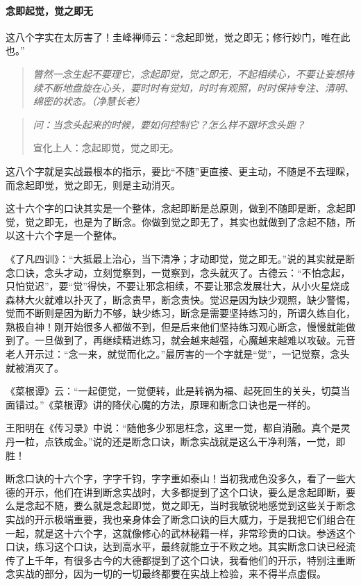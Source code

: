 \paragraph{念即起觉，觉之即无}

这八个字实在太厉害了！圭峰禅师云：“念起即觉，觉之即无；修行妙门，唯在此也。”

\begin{quote}\it
    瞥然一念生起不要理它，念起即觉，觉之即无，不起相续心，不要让妄想持续不断地盘旋在心头，要时时有觉知，时时有观照，时时保持专注、清明、绵密的状态。（净慧长老）
\end{quote}

\begin{quotation}\it
    问：当念头起来的时候，要如何控制它？怎么样不跟坏念头跑？

    宣化上人：念起即觉，觉之即无。
\end{quotation}

这八个字就是实战最根本的指示，要比“不随”更直接、更主动，不随是不去理睬，而念起即觉，觉之即无，则是主动消灭。

这十六个字的口诀其实是一个整体，念起即断是总原则，做到不随即是断，念起即觉，觉之即无，也是为了断念。你做到觉之即无了，其实也就做到了念起不随，所以这十六个字是一个整体。

《了凡四训》：“大抵最上治心，当下清净；才动即觉，觉之即无。”说的其实就是断念口诀，念头才动，立刻觉察到，一觉察到，念头就灭了。古德云：“不怕念起，只怕觉迟”，要“觉”得快，不要让邪念相续，不要让邪念发展壮大，从小火星烧成森林大火就难以扑灭了，断念贵早，断念贵快。觉迟是因为缺少观照，缺少警惕，觉而不断则是因为断力不够，缺少练习，断念是需要坚持练习的，所谓久练自化，熟极自神！刚开始很多人都做不到，但是后来他们坚持练习观心断念，慢慢就能做到了。一旦做到了，再继续精进练习，就会越来越强，心魔越来越难以攻破。元音老人开示过：“念一来，就觉而化之。”最厉害的一个字就是“觉”，一记觉察，念头就被消灭了。

《菜根谭》云：“一起便觉，一觉便转，此是转祸为福、起死回生的关头，切莫当面错过。”《菜根谭》讲的降伏心魔的方法，原理和断念口诀也是一样的。

王阳明在《传习录》中说：“随他多少邪思枉念，这里一觉，都自消融。真个是灵丹一粒，点铁成金。”说的还是断念口诀，断念实战就是这么干净利落，一觉，即胜！

断念口诀的十六个字，字字千钧，字字重如泰山！当初我戒色没多久，看了一些大德的开示，他们在讲到断念实战时，大多都提到了这个口诀，要么是念起即断，要么是念起不随，要么就是念起即觉，觉之即无，当时我敏锐地感觉到这些关于断念实战的开示极端重要，我也亲身体会了断念口诀的巨大威力，于是我把它们组合在一起，就是这十六个字，这就像修心的武林秘籍一样，非常珍贵的口诀。参透这个口诀，练习这个口诀，达到高水平，最终就能立于不败之地。其实断念口诀已经流传了上千年，有很多古今的大德都提到了这个口诀，我看他们的开示，特别注重断念实战的部分，因为一切的一切最终都要在实战上检验，来不得半点虚假。

